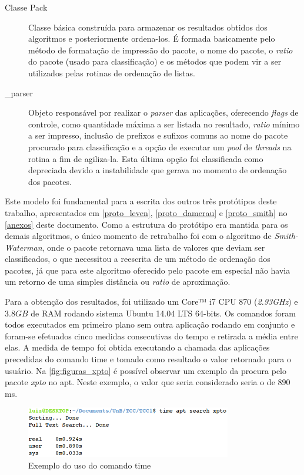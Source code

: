 \begin{description}
	\item[Classe Pack] Classe básica construída para armazenar os resultados obtidos dos algoritmos e posteriormente ordena-los. É formada basicamente pelo método de formatação de impressão do pacote, o nome do pacote, o \textit{ratio} do pacote (usado para classificação) e os métodos que podem vir a ser utilizados pelas rotinas de ordenação de listas.
	\item [\_parser] Objeto responsável por realizar o \textit{parser} das aplicações, oferecendo \textit{flags} de controle, como quantidade máxima a ser listada no resultado, \textit{ratio} mínimo a ser impresso, inclusão de prefixos e sufixos comuns ao nome do pacote procurado para classificação e a opção de executar um \textit{pool} de \textit{threads} na rotina a fim de agiliza-la. Esta última opção foi classificada como depreciada devido a instabilidade que gerava no momento de ordenação dos pacotes.
\end{description}


Este modelo foi fundamental para a escrita dos outros três protótipos deste trabalho, apresentados em \autoref{proto_leven}, \autoref{proto_damerau} e \autoref{proto_smith} no \autoref{anexos} deste documento. Como a estrutura do protótipo era mantida para os demais algoritmos, o único momento de retrabalho foi com o algoritmo de \textit{Smith-Waterman}, onde o pacote retornava uma lista de valores que deviam ser classificados, o que  necessitou a reescrita de um método de ordenação dos pacotes, já que para este algoritmo oferecido pelo pacote em especial não havia um retorno de uma simples distância ou \textit{ratio} de aproximação.


Para a obtenção dos resultados, foi utilizado um {\code Core™ i7 CPU 870} (\textit{2.93GHz})  e $3.8GB$ de RAM rodando sistema Ubuntu 14.04 LTS 64-bits. Os comandos foram todos executados em primeiro plano sem outra aplicação rodando em conjunto e foram-se efetuados cinco medidas consecutivas do tempo e retirada a média entre elas. A medida de tempo foi obtida executando a chamada das aplicações precedidas do comando {\code time} e tomado como resultado o valor retornado para o usuário. Na \autoref{fig:figuras_xpto} é possível observar um exemplo da procura pelo pacote \textit{xpto} no {\code apt}. Neste exemplo, o valor que seria considerado seria o de $890$ ms.

\begin{figure}[htbp]
  \centering
	\includegraphics[width=0.8\textwidth]{figuras/xpto}
  \caption{Exemplo do uso do comando {\code time}}
  \label{fig:figuras_xpto}
\end{figure}

